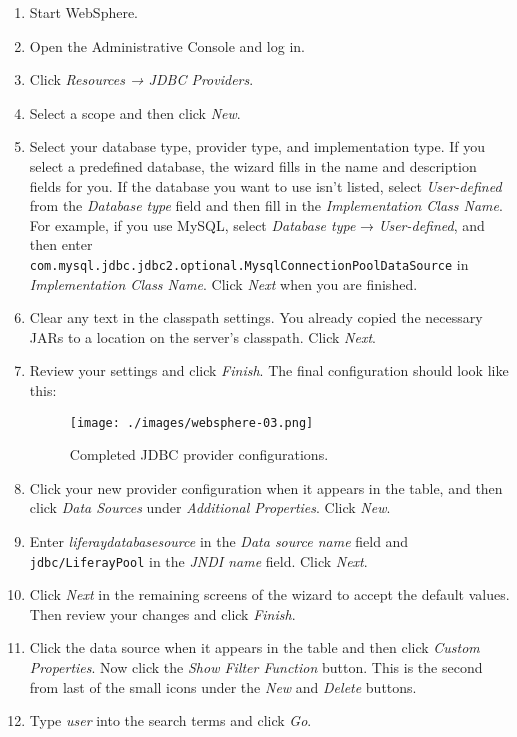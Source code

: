 \begin{enumerate}
\def\labelenumi{\arabic{enumi}.}
\item
  Start WebSphere.
\item
  Open the Administrative Console and log in.
\item
  Click \emph{Resources → JDBC Providers}.
\item
  Select a scope and then click \emph{New}.
\item
  Select your database type, provider type, and implementation type. If
  you select a predefined database, the wizard fills in the name and
  description fields for you. If the database you want to use isn't
  listed, select \emph{User-defined} from the \emph{Database type} field
  and then fill in the \emph{Implementation Class Name}. For example, if
  you use MySQL, select \emph{Database type} → \emph{User-defined}, and
  then enter
  \texttt{com.mysql.jdbc.jdbc2.optional.MysqlConnectionPoolDataSource}
  in \emph{Implementation Class Name}. Click \emph{Next} when you are
  finished.
\item
  Clear any text in the classpath settings. You already copied the
  necessary JARs to a location on the server's classpath. Click
  \emph{Next}.
\item
  Review your settings and click \emph{Finish}. The final configuration
  should look like this:

  \begin{figure}
  \centering
  \texttt{[image: ./images/websphere-03.png]}
  \caption{Completed JDBC provider configurations.}
  \end{figure}
\item
  Click your new provider configuration when it appears in the table,
  and then click \emph{Data Sources} under \emph{Additional Properties}.
  Click \emph{New}.
\item
  Enter \emph{liferaydatabasesource} in the \emph{Data source name}
  field and \texttt{jdbc/LiferayPool} in the \emph{JNDI name} field.
  Click \emph{Next}.
\item
  Click \emph{Next} in the remaining screens of the wizard to accept the
  default values. Then review your changes and click \emph{Finish}.
\item
  Click the data source when it appears in the table and then click
  \emph{Custom Properties}. Now click the \emph{Show Filter Function}
  button. This is the second from last of the small icons under the
  \emph{New} and \emph{Delete} buttons.
\item
  Type \emph{user} into the search terms and click \emph{Go}.


\end{enumerate}
